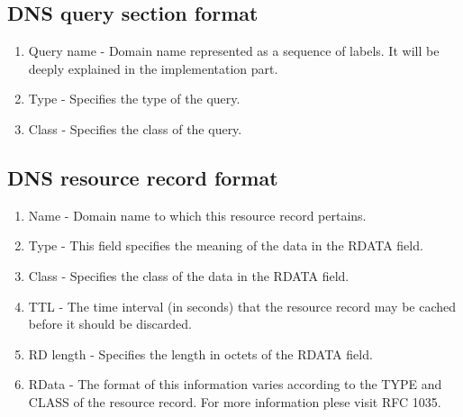 \documentclass[11pt,a4paper]{article}
\begin{document}
\subsection{DNS query section format}
\label{QUERY}


\begin{enumerate}
    \item Query name - Domain name represented as a sequence of labels. It will be deeply explained in the implementation part.
    \item Type - Specifies the type of the query.
    \item Class - Specifies the class of the query.
\end{enumerate}
\newpage

\subsection{DNS resource record format}
\label{RESPONSE}


\begin{enumerate}
    \item Name - Domain name to which this resource record pertains.
    \item Type - This field specifies the meaning of the data in the RDATA field.
    \item Class - Specifies the class of the data in the RDATA field.
    \item TTL - The time interval (in seconds) that the resource record may be cached before it should be discarded.
    \item RD length - Specifies the length in octets of the RDATA field.
    \item RData - The format of this information varies according to the TYPE and CLASS of the resource record. For more information plese visit RFC 1035\cite{RFC1035}.
\end{enumerate}
\end{document}
